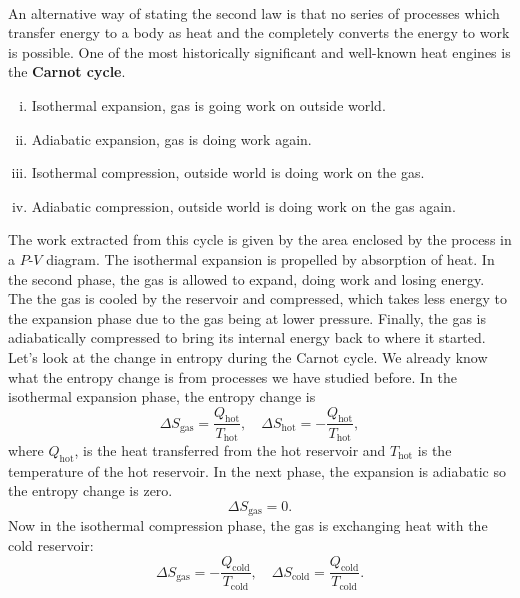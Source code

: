 \documentclass[../thermodynamics.tex]{subfiles}
\begin{document}
        \paragraph{}
        An alternative way of stating the second law is that no series of processes which transfer energy to a body as heat and the completely converts the energy to work is possible.
        One of the most historically significant and well-known heat engines is the \textbf{Carnot cycle}.
        \begin{enumerate}[(i)]
            \item Isothermal expansion, gas is going work on outside world.
            \item Adiabatic expansion, gas is doing work again.
            \item Isothermal compression, outside world is doing work on the gas.
            \item Adiabatic compression, outside world is doing work on the gas again.
        \end{enumerate}
        The work extracted from this cycle is given by the area enclosed by the process in a $P$-$V$ diagram.
        The isothermal expansion is propelled by absorption of heat.
        In the second phase, the gas is allowed to expand, doing work and losing energy.
        The the gas is cooled by the reservoir and compressed, which takes less energy to the expansion phase due to the gas being at lower pressure.
        Finally, the gas is adiabatically compressed to bring its internal energy back to where it started.
        Let's look at the change in entropy during the Carnot cycle.
        We already know what the entropy change is from processes we have studied before.
        In the isothermal expansion phase, the entropy change is
        \begin{equation}
            \Delta S_\text{gas}=\frac{Q_\text{hot}}{T_\text{hot}},\quad\Delta S_\text{hot}=-\frac{Q_\text{hot}}{T_\text{hot}},
        \end{equation}
        where $Q_\text{hot}$, is the heat transferred from the hot reservoir and $T_\text{hot}$ is the temperature of the hot reservoir.
        In the next phase, the expansion is adiabatic so the entropy change is zero.
        \begin{equation}
            \Delta S_\text{gas}=0.
        \end{equation}
        Now in the isothermal compression phase, the gas is exchanging heat with the cold reservoir:
        \begin{equation}
            \Delta S_\text{gas}=-\frac{Q_\text{cold}}{T_\text{cold}},\quad\Delta S_\text{cold}=\frac{Q_\text{cold}}{T_\text{cold}}.
        \end{equation}
\end{document}
